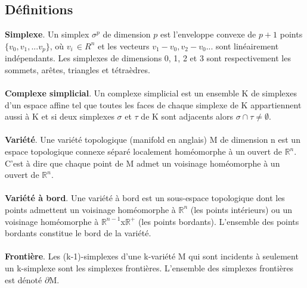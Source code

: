 \documentclass[a4paper,11pt,openany]{article}
\begin{document}
\subsection{Définitions}
\noindent
\textbf{Simplexe}. Un simplex $\sigma^p$ de dimension $p$ est l'enveloppe convexe de $p+1$ points $\{v_0,v_1,...v_p\}$, où $v_i\, \in R^n$ et les vecteurs $v_1-v_0,v_2-v_0...$ sont linéairement indépendants. Les simplexes de dimensions 0, 1, 2 et 3 sont respectivement les sommets, arêtes, triangles et tétraèdres.\\\\
\textbf{Complexe simplicial}. Un complexe simplicial est un ensemble K de simplexes d'un espace affine tel que toutes les faces de chaque simplexe de K appartiennent aussi à K et si deux simplexes $\sigma$ et $\tau$ de K sont adjacents alors $\sigma \cap \tau \neq \emptyset$.\\\\
\textbf{Variété}. Une variété topologique (manifold en anglais) M de dimension n est un espace topologique connexe séparé localement homéomorphe à un ouvert de $\mathbb{R}^n$. C'est à dire que chaque point de M admet un voisinage homéomorphe à un ouvert de $\mathbb{R}^n$.\\\\
\textbf{Variété à bord}. Une variété à bord est un sous-espace topologique dont les points admettent un voisinage homéomorphe à $\mathbb{R}^n$ (les points intérieurs) ou un voisinage homéomorphe à $\mathbb{R}^{n-1}  $x$ \mathbb{R}^+$ (les points bordants). L'ensemble des points bordants constitue le bord de la variété.\\\\
\textbf{Frontière}. Les (k-1)-simplexes d'une k-variété M qui sont incidents à seulement un k-simplexe sont les simplexes frontières. L'ensemble des simplexes frontières est dénoté $\partial $M.\\\\
\end{document}
